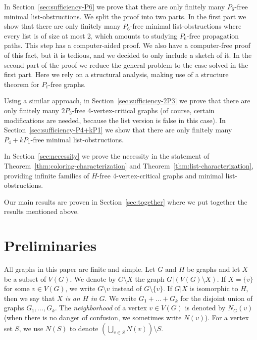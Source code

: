 \documentclass[11pt]{article}
\begin{document}
In Section~\ref{sec:sufficiency-P6} we prove that there are only finitely many $P_6$-free minimal list-obstructions.
We split the proof into two parts. In the first part we show that there are only finitely many $P_6$-free minimal list-obstructions where every list is of size at most 2, which amounts to studying $P_6$-free propagation paths. This step
has a computer-aided proof. We also have a computer-free proof of this fact, 
but it is tedious, and we decided to only include a sketch of it. 
In the second part of the proof we reduce the general problem to the case 
solved in the first part.
Here we rely on a structural analysis, making use of a structure theorem for 
$P_t$-free graphs.

Using a similar approach, in Section~\ref{sec:sufficiency-2P3} we prove that there are only finitely many $2P_3$-free 4-vertex-critical graphs (of course, certain modifications are needed, because the list version is false in this case).
In Section~\ref{sec:sufficiency-P4+kP1} we show that there are only finitely many $P_4+kP_1$-free minimal list-obstructions.

In Section~\ref{sec:necessity} we prove the necessity in the statement of Theorem~\ref{thm:coloring-characterization} and Theorem~\ref{thm:list-characterization}, providing infinite families of $H$-free 4-vertex-critical graphs and minimal list-obstructions.

Our main results are proven in Section~\ref{sec:together} where we put together the  results mentioned above.

\section{Preliminaries}\label{sec:prelims}

All graphs in this paper are finite and simple.
Let $G$ and $H$ be graphs and let $X$ be a subset of $V(G)$. 
We denote 
by $G\setminus X$ the graph $G|(V(G) \setminus X)$.
If $X=\{v\}$ for some $v \in V(G)$, we write $G \setminus v$ instead of $G \setminus \{v\}$.
If $G|X$ is isomorphic to $H$, then we say that \emph{$X$ is an $H$ in $G$}.
We write $G_1+\ldots+G_k$ for the disjoint union of graphs $G_1,\ldots,G_k$.
The \emph{neighborhood} of a vertex $v\in V(G)$ is denoted by $N_G(v)$
(when there is no danger of confusion, we sometimes write $N(v)$).
For a vertex set $S$, we use $N(S)$ to denote $(\bigcup\limits_{v\in S}N(v)) \setminus S$.
\end{document}
